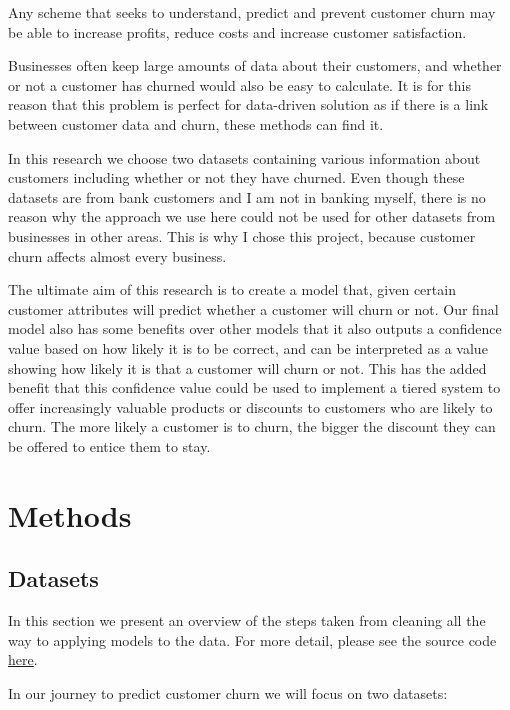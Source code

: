 \documentclass[]{article}
\begin{document}
Any scheme that seeks to understand, predict and prevent customer churn may be able to increase profits, reduce costs and increase customer satisfaction. 

Businesses often keep large amounts of data about their customers, and whether or not a customer has churned would also be easy to calculate. It is for this reason that this problem is perfect for data-driven solution as if there is a link between customer data and churn, these methods can find it.

In this research we choose two datasets containing various information about customers including whether or not they have churned. Even though these datasets are from bank customers and I am not in banking myself, there is no reason why the approach we use here could not be used for other datasets from businesses in other areas. This is why I chose this project, because customer churn affects almost every business. 

The ultimate aim of this research is to create a model that, given certain customer attributes will predict whether a customer will churn or not. Our final model also has some benefits over other models that it also outputs a confidence value based on how likely it is to be correct, and can be interpreted as a value showing how likely it is that a customer will churn or not. This has the added benefit that this confidence value could be used to implement a tiered system to offer increasingly valuable products or discounts to customers who are likely to churn. The more likely a customer is to churn, the bigger the discount they can be offered to entice them to stay.

\section{Methods}

\subsection{Datasets}

In this section we present an overview of the steps taken from cleaning all the way to applying models to the data. For more detail, please see the source code \href{https://github.com/ray33ee/Understanding-predicting-and-preventing-churn/blob/main/Customer%20Churn%20Analysis.ipynb}{here}.

In our journey to predict customer churn we will focus on two datasets:
\end{document}
